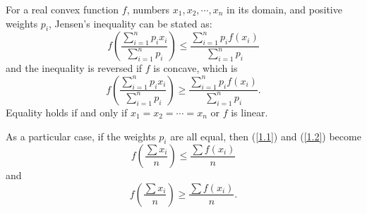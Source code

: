 \documentclass{memoir}
\begin{document}
\begin{theorem}
For a real convex function $f$, numbers $x_1,x_2,\cdots ,x_n$ in its domain, and positive weights $p_i$, Jensen's inequality can be stated as:
    \begin{equation}
    f\left(\frac{\sum\limits_{i=1}^{n} p_ix_i}{\sum\limits_{i=1}^{n} p_i}\right)\leqslant
    \frac{\sum\limits_{i=1}^{n} p_if(x_i)}{\sum\limits_{i=1}^{n} p_i}
    \label{1.1}
    \end{equation}
and the inequality is reversed if $f$ is concave, which is
    \begin{equation}
    f\left(\frac{\sum\limits_{i=1}^{n} p_ix_i}{\sum\limits_{i=1}^{n} p_i}\right)\geqslant
    \frac{\sum\limits_{i=1}^{n} p_if(x_i)}{\sum\limits_{i=1}^{n} p_i}.
    \label{1.2}
    \end{equation}
Equality holds if and only if $x_1=x_2=\cdots=x_n$ or $f$ is linear.\\
\end{theorem}
As a particular case, if the weights $p_i$ are all equal, then 
(\ref{1.1}) and (\ref{1.2}) become  
    \begin{equation}
    f\left(\frac{\sum x_i}{n}\right)\leqslant
    \frac{\sum f(x_i)}{n}
    \label{1.3}
    \end{equation}
and
    \begin{equation}
    f\left(\frac{\sum x_i}{n}\right)\geqslant
    \frac{\sum f(x_i)}{n}.
    \end{equation}      
\end{document}
